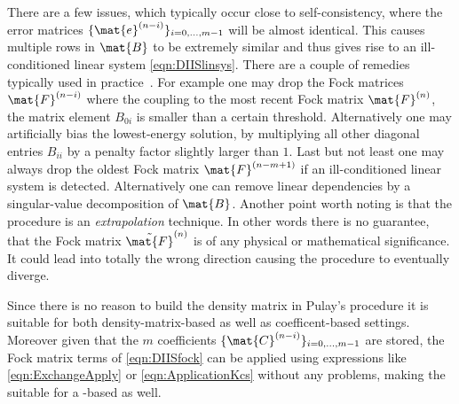 There are a few issues,
which typically occur close to self-consistency,
where the error matrices $\{\mat{e}^{(n-i)}\}_{i=0,\ldots,m-1}$
will be almost identical.
This causes multiple rows in $\mat{B}$ to be extremely similar
and thus gives rise to an ill-conditioned linear system \eqref{eqn:DIISlinsys}.
There are a couple of remedies typically used in practice~\cite{Kudin2002}.
For example one may drop the Fock matrices $\mat{F}^{(n-i)}$
where the coupling to the most recent Fock matrix $\mat{F}^{(n)}$,
\ie the matrix element $B_{0i}$ is smaller than a certain threshold.
Alternatively one may artificially bias the lowest-energy solution,
by multiplying all other diagonal entries $B_{ii}$ by a penalty
factor slightly larger than $1$.
Last but not least one may always drop the oldest Fock matrix
$\mat{F}^{(n-m+1)}$ if an ill-conditioned linear system is detected.
Alternatively one can remove linear dependencies by a singular-value
decomposition of $\mat{B}$.
Another point worth noting is that the \DIIS procedure is an \emph{extrapolation}
technique.
In other words there is no guarantee,
that the Fock matrix $\tilde{\mat{F}}^{(n)}$ is of any physical
or mathematical significance.
It could lead into totally the wrong direction causing the \SCF
procedure to eventually diverge.

Since there is no reason to build the density matrix
in Pulay's \DIIS procedure
it is suitable for both density-matrix-based as well as coefficent-based \SCF settings.
Moreover given that the $m$ coefficients $\{ \mat{C}^{(n-i)} \}_{i=0,\ldots,m-1}$
are stored,
the Fock matrix terms of \eqref{eqn:DIISfock}
can be applied using expressions like \eqref{eqn:ExchangeApply}
or \eqref{eqn:ApplicationKcs} without any problems,
making the \DIIS suitable for a \contraction-based \SCF as well.

